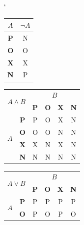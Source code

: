 \documentclass[a4paper, 11pt]{article}
\begin{document}
\bigskip
\begin{table}[h!]
	\catcode`
	\centering
	\begin{tabular}{|c|c|}
		\hline
		$A$        & $\neg A$ \\
		\hline
		\textbf{P} & N        \\
		\textbf{O} & O        \\
		\textbf{X} & X        \\
		\textbf{N} & P        \\
		\hline
	\end{tabular}
	\begin{tabular}{|c|c|c|c|c|c|}
		\hline
		\multicolumn{2}{|c|}{\multirow{2}{*}{$A \wedge B$}} & \multicolumn{4}{c|}{$B$}                                            \\\cline{3-6}
		\multicolumn{2}{|c|}{ }                             & \textbf{P}               & \textbf{O} & \textbf{X} & \textbf{N}     \\
		\hline
		\multirow{4}{*}{$A$}
		                                                    & \textbf{P}               & P          & O          & X          & N \\ \cline{2-6}
		                                                    & \textbf{O}               & O          & O          & N          & N \\ \cline{2-6}
		                                                    & \textbf{X}               & X          & N          & X          & N \\ \cline{2-6}
		                                                    & \textbf{N}               & N          & N          & N          & N \\ \cline{2-6}
		\hline
	\end{tabular}
	\begin{tabular}{|c|c|c|c|c|c|}
		\hline
		\multicolumn{2}{|c|}{\multirow{2}{*}{$A \vee B$}} & \multicolumn{4}{c|}{$B$}                                             \\\cline{3-6}
		\multicolumn{2}{|c|}{ }                           & \textbf{P}               & \textbf{O} & \textbf{X} & \textbf{N}      \\
		\hline
		\multirow{4}{*}{$A$}
		                                                  & \textbf{P}               & P          & P          & P          & P  \\ \cline{2-6}
		                                                  & \textbf{O}               & P          & O          & P          & O  \\ \cline{2-6}

\end{tabular}
\end{table}
\end{document}
